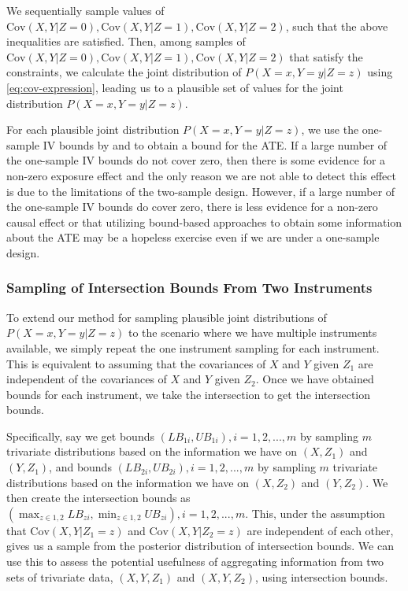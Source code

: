 \documentclass[
]{article}
\theoremstyle{plain}
\begin{document}
We sequentially sample values of \(\text{Cov}(X, Y | Z = 0), \text{Cov}(X, Y | Z = 1), \text{Cov}(X, Y | Z = 2)\), such that the above inequalities are satisfied. Then, among samples of \(\text{Cov}(X, Y | Z = 0), \text{Cov}(X, Y | Z = 1), \text{Cov}(X, Y | Z = 2)\) that satisfy the constraints, we calculate the joint distribution of \(P(X = x, Y = y | Z = z)\) using \eqref{eq:cov-expression}, leading us to a plausible set of values for the joint distribution \(P(X = x, Y = y | Z = z)\).

For each plausible joint distribution \(P(X = x, Y = y | Z = z)\), we use the one-sample IV bounds by \textcite{balke_bounds_1997} and \textcite{richardson_ace_2014} to obtain a bound for the ATE. If a large number of the one-sample IV bounds do not cover zero, then there is some evidence for a non-zero exposure effect and the only reason we are not able to detect this effect is due to the limitations of the two-sample design. However, if a large number of the one-sample IV bounds do cover zero, there is less evidence for a non-zero causal effect or that utilizing bound-based approaches to obtain some information about the ATE may be a hopeless exercise even if we are under a one-sample design.

\hypertarget{sampling-of-intersection-bounds-from-two-instruments}{%
\subsubsection{\texorpdfstring{Sampling of Intersection Bounds From Two Instruments \label{sample-intersection-bounds}}{Sampling of Intersection Bounds From Two Instruments }}\label{sampling-of-intersection-bounds-from-two-instruments}}

To extend our method for sampling plausible joint distributions of \(P(X = x, Y = y | Z = z)\) to the scenario where we have multiple instruments available, we simply repeat the one instrument sampling for each instrument. This is equivalent to assuming that the covariances of \(X\) and \(Y\) given \(Z_1\) are independent of the covariances of \(X\) and \(Y\) given \(Z_2\). Once we have obtained bounds for each instrument, we take the intersection to get the intersection bounds.

Specifically, say we get bounds \((LB_{1i},UB_{1i}),i = 1,2,...,m\) by sampling \(m\) trivariate distributions based on the information we have on \((X,Z_1)\) and \((Y,Z_1)\), and bounds \((LB_{2i}, UB_{2i}),i = 1,2,...,m\) by sampling \(m\) trivariate distributions based on the information we have on \((X,Z_2)\) and \((Y,Z_2)\). We then create the intersection bounds as \(\left(\max_{z \in {1,2}} LB_{zi}, \min_{z \in {1,2}} UB_{zi}\right), i = 1, 2, ..., m\). This, under the assumption that \(\text{Cov}(X, Y | Z_1 = z)\) and \(\text{Cov}(X, Y | Z_2 = z)\) are independent of each other, gives us a sample from the posterior distribution of intersection bounds. We can use this to assess the potential usefulness of aggregating information from two sets of trivariate data, \((X, Y, Z_1)\) and \((X, Y, Z_2)\), using intersection bounds.
\end{document}
